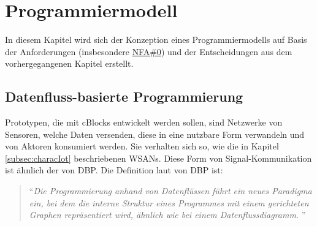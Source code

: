 \section{Programmiermodell}
In diesem Kapitel wird sich der Konzeption eines Programmiermodells auf Basis der Anforderungen (insbesondere \hyperref[tab:NFA0]{NFA\#0}) und der Entscheidungen aus dem vorhergegangenen Kapitel erstellt.

\subsection{Datenfluss-basierte Programmierung}\label{subsection:datenflussprog}
Prototypen, die mit cBlocks entwickelt werden sollen, sind Netzwerke von Sensoren, welche Daten versenden, diese in eine nutzbare Form verwandeln und von Aktoren konsumiert werden. Sie verhalten sich so, wie die in Kapitel \ref{subsec:characIot} beschriebenen \acp{WSAN}. Diese Form von Signal-Kommunikation ist ähnlich der von \ac{DBP}. Die Definition  laut \cite{sousa2012dataflow} von \ac{DBP} ist:
\begin{quote}
    "`\textit{Die Programmierung anhand von Datenflüssen führt ein neues Paradigma ein, bei dem die interne Struktur eines Programmes mit einem gerichteten Graphen repräsentiert wird, ähnlich wie bei einem Datenflussdiagramm.} "'
\end{quote}

